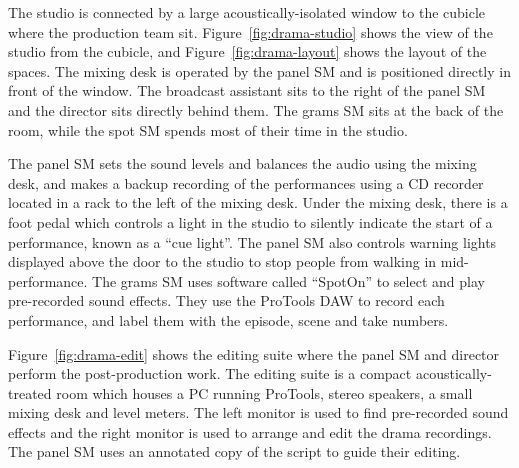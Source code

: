 The studio is connected by a large acoustically-isolated window to the cubicle where the production team sit.
Figure~\ref{fig:drama-studio} shows the view of the studio from the cubicle, and Figure~\ref{fig:drama-layout} shows
the layout of the spaces. The mixing desk is operated by the panel SM and is positioned directly in front of the
window.  The broadcast assistant sits to the right of the panel SM and the director sits directly behind them. The
grams SM sits at the back of the room, while the spot SM spends most of their time in the studio.

The panel SM sets the sound levels and balances the audio using the mixing desk, and makes a backup recording of the
performances using a CD recorder located in a rack to the left of the mixing desk.  Under the mixing desk, there is a
foot pedal which controls a light in the studio to silently indicate the start of a performance, known as a ``cue
light''. The panel SM also controls warning lights displayed above the door to the studio to stop people from walking
in mid-performance.  The grams SM uses software called ``SpotOn'' to select and play pre-recorded sound effects. They
use the ProTools DAW to record each performance, and label them with the episode, scene and take numbers.

Figure~\ref{fig:drama-edit} shows the editing suite where the panel SM and director perform the post-production work.
The editing suite is a compact acoustically-treated room which houses a PC running ProTools, stereo speakers, a small
mixing desk and level meters.  The left monitor is used to find pre-recorded sound effects and the right monitor is
used to arrange and edit the drama recordings. The panel SM uses an annotated copy of the script to guide their
editing.

